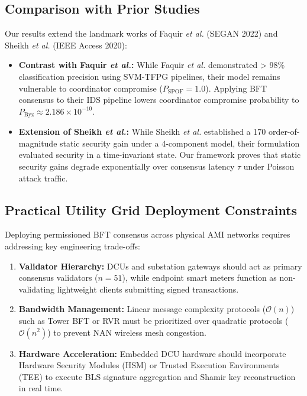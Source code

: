 \documentclass[10pt,twocolumn,journal]{IEEEtran}
\begin{document}
\subsection{Comparison with Prior Studies}
Our results extend the landmark works of Faquir \textit{et al.} (SEGAN 2022) and Sheikh \textit{et al.} (IEEE Access 2020):
\begin{itemize}[leftmargin=*]
    \item \textbf{Contrast with Faquir \textit{et al.}:} While Faquir \textit{et al.} demonstrated > 98\% classification precision using SVM-TFPG pipelines, their model remains vulnerable to coordinator compromise ($P_{\text{SPOF}} = 1.0$). Applying BFT consensus to their IDS pipeline lowers coordinator compromise probability to $P_{\text{Byz}} \approx 2.186 \times 10^{-10}$.
    \item \textbf{Extension of Sheikh \textit{et al.}:} While Sheikh \textit{et al.} established a 170 order-of-magnitude static security gain under a 4-component model, their formulation evaluated security in a time-invariant state. Our framework proves that static security gains degrade exponentially over consensus latency $\tau$ under Poisson attack traffic.
\end{itemize}

\subsection{Practical Utility Grid Deployment Constraints}
Deploying permissioned BFT consensus across physical AMI networks requires addressing key engineering trade-offs:
\begin{enumerate}[leftmargin=*]
    \item \textbf{Validator Hierarchy:} DCUs and substation gateways should act as primary consensus validators ($n=51$), while endpoint smart meters function as non-validating lightweight clients submitting signed transactions.
    \item \textbf{Bandwidth Management:} Linear message complexity protocols ($\mathcal{O}(n)$) such as Tower BFT or RVR must be prioritized over quadratic protocols ($\mathcal{O}(n^2)$) to prevent NAN wireless mesh congestion.
    \item \textbf{Hardware Acceleration:} Embedded DCU hardware should incorporate Hardware Security Modules (HSM) or Trusted Execution Environments (TEE) to execute BLS signature aggregation and Shamir key reconstruction in real time.
\end{enumerate}
\end{document}

